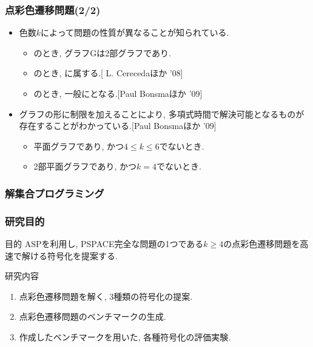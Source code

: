 \documentclass[dvipdfmx,11pt]{beamer}
\begin{document}
\begin{frame}\frametitle{点彩色遷移問題(2/2)}

  \begin{itemize}
    \item 色数$k$によって問題の性質が異なることが知られている.
    \begin{itemize}
      \item {}のとき, グラフGは2部グラフであり.
      \item {}のとき, に属する.[ L. Cerecedaほか '08]
      \item {}のとき, 一般にとなる.[Paul Bonsmaほか '09]
    \end{itemize}

    \item グラフの形に制限を加えることにより, 多項式時間で解決可能となるものが存在することがわかっている.[Paul Bonsmaほか '09]
    \begin{itemize}
      \item 平面グラフであり, かつ$4 \le k \le 6$でないとき.
      \item 2部平面グラフであり, かつ$k=4$でないとき.
    \end{itemize}

  \end{itemize}

\end{frame}


\begin{frame}\frametitle{解集合プログラミング}
  
\end{frame}


\begin{frame}\frametitle{研究目的}
  \begin{alertblock}{目的}
    ASPを利用し, PSPACE完全な問題の1つである$k \ge 4$の点彩色遷移問題を高速で解ける符号化を提案する.
  \end{alertblock}

  \begin{block}{研究内容} %
    \begin{enumerate}
      \item 点彩色遷移問題を解く, 3種類の符号化の提案.
      \item 点彩色遷移問題のベンチマークの生成.
      \item 作成したベンチマークを用いた, 各種符号化の評価実験.
    \end{enumerate}
  \end{block}

\end{frame}
\end{document}
